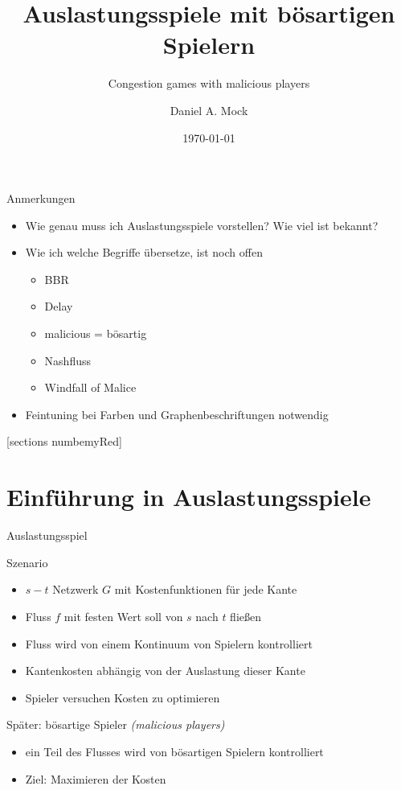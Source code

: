 \documentclass{beamer}
\title{Auslastungsspiele mit bösartigen Spielern}
\subtitle{Congestion games with malicious players}
\date{\today}
\author{Daniel A. Mock}
\institute{Lehrstuhl i1 -- RWTH Aachen}
\begin{document}
\begin{frame}{Anmerkungen}
	\begin{itemize}
		\item Wie genau muss ich Auslastungsspiele vorstellen? Wie viel ist bekannt?
		\item Wie ich welche Begriffe übersetze, ist noch offen
		\begin{itemize}
			\item BBR
			\item Delay
			\item malicious = bösartig
			\item Nashfluss
			\item Windfall of Malice
		\end{itemize}
		\item Feintuning bei Farben und Graphenbeschriftungen notwendig
	\end{itemize}
\end{frame}

\maketitle

[sections numbemyRed]

\section{Einführung in Auslastungsspiele}
\begin{frame}{Auslastungsspiel}
	\begin{block}{Szenario}
		\begin{itemize}
			\item $s-t$ Netzwerk $G$ mit Kostenfunktionen für jede Kante
			\item Fluss $f$ mit festen Wert soll von $s$ nach $t$ fließen
			\item Fluss wird von einem Kontinuum von Spielern kontrolliert
			\item Kantenkosten abhängig von der Auslastung dieser Kante
			\item Spieler versuchen Kosten zu optimieren
		\end{itemize}
	\end{block}

	\begin{block}{Später: bösartige Spieler \emph{(malicious players)}}
		\begin{itemize}
			\item ein Teil des Flusses wird von bösartigen Spielern kontrolliert
			\item Ziel: Maximieren der Kosten
		\end{itemize}
	\end{block}
\end{frame}
\end{document}
